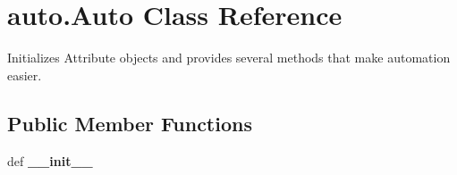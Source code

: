 \hypertarget{classauto_1_1_auto}{\section{auto.\-Auto Class Reference}
\label{classauto_1_1_auto}
}


Initializes Attribute objects and provides several methods that make automation easier.  


\subsection*{Public Member Functions}
\begin{DoxyCompactItemize}
\item 
\hypertarget{classauto_1_1_auto_a81c72849e550a27ff900aa38ef28d1c8}{def {\bfseries \-\_\-\-\_\-init\-\_\-\-\_\-}}\label{classauto_1_1_auto_a81c72849e550a27ff900aa38ef28d1c8}


\end{DoxyCompactItemize}
